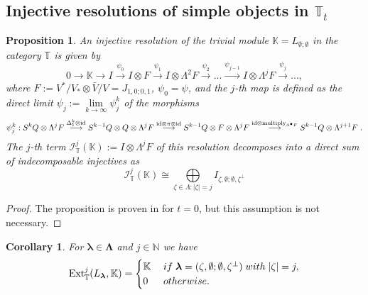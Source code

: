 \documentclass[12pt]{article}
\def\KK {{\mathbb K}}     %
\def\NN {{\mathbb N}}     %
\def\TT {{\mathbb T}}     %
\def\lw  {\longrightarrow}
\def\mc {\mathcal}
\newtheorem{prop}[theorem]{Proposition}
\newtheorem{coro}[theorem]{Corollary}
\begin{document}
\subsection{Injective resolutions of simple objects in $\TT_t$}\label{Sec InjResTT}


\begin{prop}\label{Prop InjRes C in T}
An injective resolution of the trivial module $\KK=L_{\emptyset;\emptyset}$ in the category $\TT$ is given by
$$
0\to \KK \to I \stackrel{\psi_0}{\to} I\otimes F \stackrel{\psi_1}{\to} I\otimes \Lambda^2F \stackrel{\psi_2}{\to} ... \stackrel{\psi_{j-1}}{\to} I\otimes \Lambda^jF \stackrel{\psi_j}{\to} ...,
$$
where $F:=V^*/V_*\otimes \bar V/V=J_{1,0;0,1}$, $\psi_0=\psi$, and the $j$-th map is defined as the direct limit $\psi_j:=\lim\limits_{k\to\infty} \psi_j^k$ of the morphisms
\begin{gather*}
\psi_j^k: S^kQ \otimes \Lambda^jF \stackrel{\Delta^k_1\otimes{\rm id}}{\lw} S^{k-1}Q\otimes Q\otimes \Lambda^jF \stackrel{{\rm id}\otimes\pi \otimes{\rm id}}{\lw} S^{k-1}Q \otimes F \otimes \Lambda^jF \stackrel{{\rm id}\otimes{\rm multiply}_{\Lambda^\bullet F}}{\lw} S^{k-1}Q \otimes \Lambda^{j+1}F \;.
\end{gather*}
The $j$-th term $\mc I^{j}_\TT(\KK):=I\otimes \Lambda^jF$ of this resolution decomposes into a direct sum of indecomposable injectives as
$$
\mc I^j_{\TT}(\KK) \cong \bigoplus\limits_{\zeta\in\Lambda:|\zeta|=j} I_{\zeta,\emptyset;\emptyset,\zeta^\perp}
$$
\end{prop}

\begin{proof}
The proposition is proven in \cite[\S~3.5]{Chirvasitu-Penkov-UTC} for $t=0$, but this assumption is not necessary.
\end{proof}


\begin{coro}
For $\bm\lambda\in\bm\Lambda$ and $j\in\NN$ we have
$$
{\rm Ext}^j_{\TT}(L_{\bm\lambda},\KK) = \begin{cases} \KK &\; if\;\bm\lambda=(\zeta,\emptyset;\emptyset,\zeta^\perp)\; with\; |\zeta|=j,\\
0 &\; otherwise. \end{cases}
$$
\end{coro}
\end{document}
